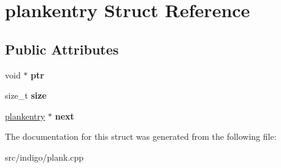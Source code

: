 \hypertarget{structplankentry}{}\section{plankentry Struct Reference}
\label{structplankentry}
\subsection*{Public Attributes}
\begin{DoxyCompactItemize}
\item 
\mbox{\label{structplankentry_a16d8d18966483144fc49e496e75cdfa6}} 
void $\ast$ {\bfseries ptr}
\item 
\mbox{\label{structplankentry_a22ad83e491df0cc6e747c4388166cdcb}} 
size\+\_\+t {\bfseries size}
\item 
\mbox{\label{structplankentry_a296c7c00bbd98a52896d8f1c7d5b3d20}} 
\hyperlink{structplankentry}{plankentry} $\ast$ {\bfseries next}
\end{DoxyCompactItemize}


The documentation for this struct was generated from the following file\+:\begin{DoxyCompactItemize}
\item 
src/indigo/plank.\+cpp\end{DoxyCompactItemize}
